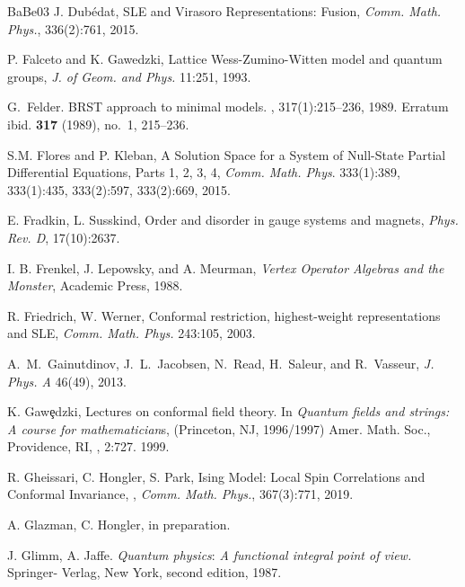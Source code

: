 \documentclass[12pt,oneside,english]{amsart}
\numberwithin{equation}{section}
\numberwithin{figure}{section}
\theoremstyle{plain}
\theoremstyle{plain}
\theoremstyle{plain}
\theoremstyle{plain}
\theoremstyle{remark}
\theoremstyle{definition}
\theoremstyle{plain}
\theoremstyle{plain}
\numberwithin{thm}{section}
\begin{document}
\begin{thebibliography}{BaBe03}
J. Dub\'edat, SLE and Virasoro Representations:
Fusion, \emph{Comm. Math. Phys.}, 336(2):761, 2015.

P. Falceto and K. Gawedzki, Lattice
Wess-Zumino-Witten model and quantum groups, \emph{J. of Geom. and
Phys.} 11:251, 1993.

G.~Felder.
\newblock B{RST} approach to minimal models.
, 317(1):215--236, 1989.
\newblock Erratum ibid. {\bf 317} (1989), no.\ 1, 215--236.

S.M. Flores and P. Kleban, A Solution
Space for a System of Null-State Partial Differential Equations, Parts
1, 2, 3, 4, \emph{Comm. Math. Phys}. 333(1):389, 
333(1):435,
333(2):597, 333(2):669, 2015.

E. Fradkin, L. Susskind, Order
and disorder in gauge systems and magnets, \emph{Phys. Rev. D}, 
17(10):2637.

I. B. Frenkel, J. Lepowsky,
and A. Meurman, \emph{Vertex Operator Algebras and the Monster}, Academic
Press, 1988.

R. Friedrich, W. Werner, Conformal
restriction, highest-weight representations and SLE, \emph{Comm. Math.
Phys.} 243:105, 2003.

A.~M.~Gainutdinov, J.~L.~Jacobsen, N.~Read, H.~Saleur, and R.~Vasseur,
\emph{J. Phys. A} 46(49), 2013.

K. Gaw\c{e}dzki, Lectures on conformal field
theory. In \emph{Quantum fields and strings: A course for mathematician}s,
(Princeton, NJ, 1996/1997) Amer. Math. Soc., Providence, RI, , 2:727.
1999.

R. Gheissari, C. Hongler,
S. Park, Ising Model: Local Spin Correlations and Conformal Invariance,
, \emph{Comm. Math. Phys.}, 367(3):771, 2019.


A. Glazman, C. Hongler, in preparation.

J. Glimm, A. Jaffe. \emph{Quantum physics}:\emph{
A functional integral point of view.} Springer- Verlag, New York,
second edition, 1987.


\end{thebibliography}
\end{document}
